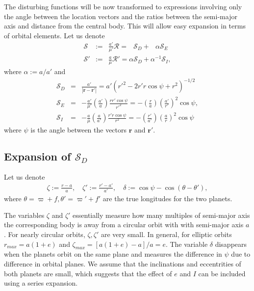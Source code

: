 \documentclass [12pt, a4paper] {article}
\newcommand{\vc}[1]
{
	\boldsymbol{#1}
}
\begin{document}
The disturbing functions will be now transformed to expressions involving only the 
angle between the location vectors and the ratios between the semi-major axis and 
distance from the central body. This will allow easy expansion in terms of orbital 
elements. Let us denote 
\begin {eqnarray}
    \label{eq:R_S1}
    \mathcal S
    &:=&
    \frac{a'}{\overline{\mu}'}\mathcal R
    = 
    \:\:\;\mathcal{S}_D + \;\:\:\alpha \mathcal{S}_E
    \\
    \label{eq:R_S2}
    \mathcal S'
    &:=&
    \frac{a}{\overline{\mu}}\mathcal R'
    = 
    \alpha\mathcal{S}_D + \alpha^{-1}\mathcal{S}_I,
\end {eqnarray}
where $\alpha := a/a'$ and 
\begin {eqnarray}
    \label{eq:S_D}
    \mathcal{S}_D &=& \frac{a'}{|\vc r - \vc r'|}
    =
    a'\left(r'^2 - 2r'r\cos\psi + r^2\right)^{-1/2}
    \\
    \label{eq:S_E}
    \mathcal{S}_E &=& 
    -\frac{a'}{\overline{\mu}'}\left(\frac{a'}{a}\right)\frac{r r'\cos\psi}{r'^2}
    =
    -\left(\frac{r}{a}\right)\left(\frac{a'}{r'}\right)^2\cos\psi,
    \\
    \label{eq:S_I}
    \mathcal{S}_I &=&
    -\frac{a}{\overline\mu}\left(\frac{a}{a'}\right)\frac{r' r\cos\psi}{r^2}
    = 
    -\left(\frac{r'}{a'}\right)\left(\frac{a}{r}\right)^2\cos\psi
\end {eqnarray}
where $\psi$ is the angle between the vectors $\vc r$ and $\vc r'$.


\subsection{Expansion of $\mathcal{S}_D$}
Let us denote
\begin {eqnarray}
    \zeta := \frac{r - a}{a},
    \quad
    \zeta' := \frac{r' - a'}{a'},
    \quad 
    \delta := \cos\psi - \cos(\theta - \theta'),
\end {eqnarray}
where $\theta = \varpi + f, \theta' = \varpi' + f'$ are the true longitudes for the two planets.

The variables $\zeta$ and $\zeta'$ essentially measure how many multiples of semi-major axis the 
corresponding body is away from a circular orbit with with semi-major axis $a$. For nearly 
circular orbits, $\zeta, \zeta'$ are very small. In general, for elliptic orbits 
$r_{max} = a(1+e)$ and $\zeta_{max} = [a(1+e) - a]/a = e$. The variable $\delta$ disappears when the 
planets orbit on the same plane and measures the difference in $\psi$ due to difference in 
orbital planes. We assume that the inclinations and eccentrities of both planets are small,
which suggests that the effect of $e$ and $I$ can be included using a series expansion.
\end{document}
